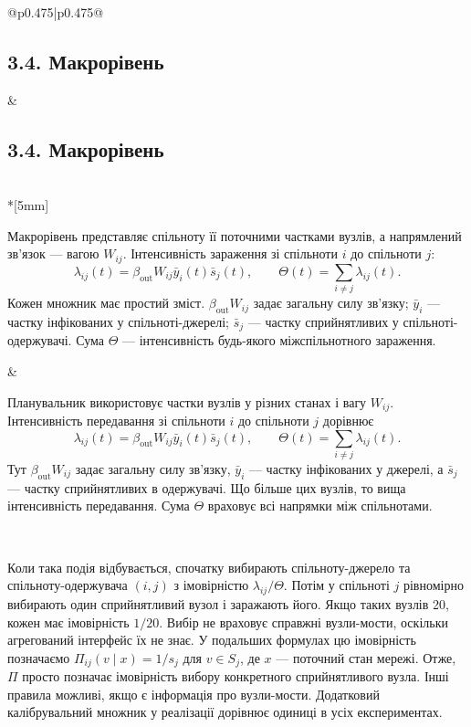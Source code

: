 \documentclass[11pt]{article}
\newcommand{\ibar}{\bar{y}}
\newcommand{\sbar}{\bar{s}}
\begin{document}
\begin{longtable}{@{}p{0.475\textwidth}|p{0.475\textwidth}@{}}
\begin{minipage}[t]{\linewidth}
\subsection*{3.4. Макрорівень}

\end{minipage} &
\begin{minipage}[t]{\linewidth}
\subsection*{3.4. Макрорівень}

\end{minipage} \\*[5mm]
\begin{minipage}[t]{\linewidth}
Макрорівень представляє спільноту її поточними частками вузлів, а напрямлений зв'язок --- вагою $W_{ij}$. Інтенсивність зараження зі спільноти $i$ до спільноти $j$:
\begin{equation*}\lambda_{ij}(t)=\beta_{\mathrm{out}}W_{ij}\ibar_i(t)\sbar_j(t),
\qquad \Theta(t)=\sum_{i\neq j}\lambda_{ij}(t).\tag{4}
\end{equation*}
Кожен множник має простий зміст. $\beta_{\mathrm{out}}W_{ij}$ задає загальну силу зв'язку; $\ibar_i$ --- частку інфікованих у спільноті-джерелі; $\sbar_j$ --- частку сприйнятливих у спільноті-одержувачі. Сума $\Theta$ --- інтенсивність будь-якого міжспільнотного зараження.
\end{minipage} &
\begin{minipage}[t]{\linewidth}
Планувальник використовує частки вузлів у різних станах і вагу $W_{ij}$. Інтенсивність передавання зі спільноти $i$ до спільноти $j$ дорівнює
\begin{equation*}\lambda_{ij}(t)=\beta_{\mathrm{out}}W_{ij}\ibar_i(t)\sbar_j(t),
\qquad \Theta(t)=\sum_{i\neq j}\lambda_{ij}(t).\tag{4}
\end{equation*}
Тут $\beta_{\mathrm{out}}W_{ij}$ задає загальну силу зв'язку, $\ibar_i$ --- частку інфікованих у джерелі, а $\sbar_j$ --- частку сприйнятливих в одержувачі. Що більше цих вузлів, то вища інтенсивність передавання. Сума $\Theta$ враховує всі напрямки між спільнотами.
\end{minipage} \\[5mm]
\begin{minipage}[t]{\linewidth}
Коли така подія відбувається, спочатку вибирають спільноту-джерело та спільноту-одержувача $(i,j)$ з імовірністю $\lambda_{ij}/\Theta$. Потім у спільноті $j$ рівномірно вибирають один сприйнятливий вузол і заражають його. Якщо таких вузлів 20, кожен має імовірність $1/20$. Вибір не враховує справжні вузли-мости, оскільки агрегований інтерфейс їх не знає. У подальших формулах цю імовірність позначаємо $\Pi_{ij}(v\mid x)=1/s_j$ для $v\in S_j$, де $x$ --- поточний стан мережі. Отже, $\Pi$ просто позначає імовірність вибору конкретного сприйнятливого вузла. Інші правила можливі, якщо є інформація про вузли-мости. Додатковий калібрувальний множник у реалізації дорівнює одиниці в усіх експериментах.

\end{minipage}
\end{longtable}
\end{document}
